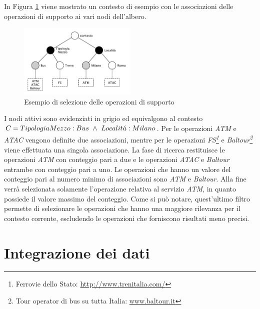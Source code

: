 In Figura \ref{fig:esempio-selezione-supporto} viene mostrato un contesto di esempio con le associazioni delle operazioni di supporto ai vari nodi dell'albero.

\begin{figure}[ht]
	\centering
	\includegraphics[width=0.5\textwidth]{3-metodologia-camus/Immagini/esempio-selezione-supporto.pdf}
	\caption{Esempio di selezione delle operazioni di supporto}\label{fig:esempio-selezione-supporto}
\end{figure}

I nodi attivi sono evidenziati in grigio ed equivalgono al contesto $ C = Tipologia\\Mezzo: Bus\ \land\ Localit\acute{a}: Milano $. Per le operazioni \emph{ATM} e \emph{ATAC} vengono definite due associazioni, mentre per le operazioni \emph{FS\footnote{Ferrovie dello Stato: \url{http://www.trenitalia.com/}}} e \emph{Baltour\footnote{Tour operator di bus su tutta Italia: \url{www.baltour.it}}} viene effettuata una singola associazione. La fase di ricerca restituisce le operazioni \emph{ATM} con conteggio pari a due e le operazioni \emph{ATAC} e \emph{Baltour} entrambe con conteggio pari a uno. Le operazioni che hanno un valore del conteggio pari al numero minimo di associazioni sono \emph{ATM} e \emph{Baltour}. Alla fine verrà selezionata solamente l'operazione relativa al servizio \emph{ATM}, in quanto possiede il valore massimo del conteggio. Come si può notare, quest'ultimo filtro permette di selezionare le operazioni che hanno una maggiore rilevanza per il contesto corrente, escludendo le operazioni che forniscono risultati meno precisi.

\section{Integrazione dei dati\label{sec:integrazione-dati}}

